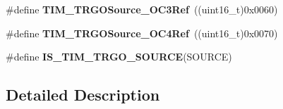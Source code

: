 \begin{DoxyCompactItemize}
\item 
\hypertarget{group___t_i_m___trigger___output___source_ga40943bc1c3f22b983c683cbf0e87a218}{\#define {\bfseries T\-I\-M\-\_\-\-T\-R\-G\-O\-Source\-\_\-\-O\-C3\-Ref}~((uint16\-\_\-t)0x0060)}\label{group___t_i_m___trigger___output___source_ga40943bc1c3f22b983c683cbf0e87a218}

\item 
\hypertarget{group___t_i_m___trigger___output___source_gafc81561599199912d613c65f760919bc}{\#define {\bfseries T\-I\-M\-\_\-\-T\-R\-G\-O\-Source\-\_\-\-O\-C4\-Ref}~((uint16\-\_\-t)0x0070)}\label{group___t_i_m___trigger___output___source_gafc81561599199912d613c65f760919bc}

\item 
\#define {\bfseries I\-S\-\_\-\-T\-I\-M\-\_\-\-T\-R\-G\-O\-\_\-\-S\-O\-U\-R\-C\-E}(S\-O\-U\-R\-C\-E)
\end{DoxyCompactItemize}


\subsection{Detailed Description}


